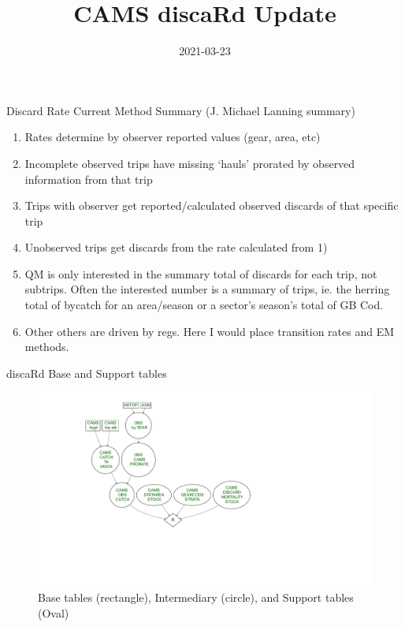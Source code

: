 \documentclass[
  ignorenonframetext,
]{beamer}
\title{CAMS discaRd Update}
\author{Ben Galuardi \& Dan Linden \and \footnote<.->{APSD}}
\date{2021-03-23}
\providecommand{\tightlist}{%
  \setlength{\itemsep}{0pt}\setlength{\parskip}{0pt}}
\begin{document}
\frame{\titlepage}

\begin{frame}{Discard Rate Current Method Summary (J. Michael Lanning
summary)}
\protect\hypertarget{discard-rate-current-method-summary-j.-michael-lanning-summary}{}

\begin{enumerate}
\tightlist
\item
  Rates determine by observer reported values (gear, area, etc)
\item
  Incomplete observed trips have missing `hauls' prorated by observed
  information from that trip
\item
  Trips with observer get reported/calculated observed discards of that
  specific trip
\item
  Unobserved trips get discards from the rate calculated from 1)
\item
  QM is only interested in the summary total of discards for each trip,
  not subtrips. Often the interested number is a summary of trips, ie.
  the herring total of bycatch for an area/season or a sector's season's
  total of GB Cod.
\item
  Other others are driven by regs. Here I would place transition rates
  and EM methods.
\end{enumerate}

\end{frame}

\begin{frame}{discaRd Base and Support tables}
\protect\hypertarget{discard-base-and-support-tables}{}

\begin{figure}
\centering
\includegraphics{discard_documention_beamer_files/figure-beamer/table_flow0-1.pdf}
\caption{Base tables (rectangle), Intermediary (circle), and Support
tables (Oval)}
\end{figure}

\end{frame}
\end{document}
